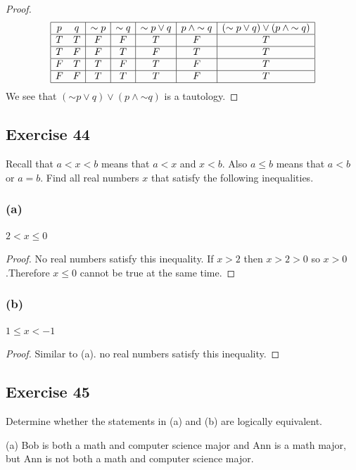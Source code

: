 \documentclass[14pt]{extarticle}
\begin{document}
\begin{proof}
$$
\begin{array}{|cc|c|c|c|c|c|}
\hline
p & q & {\sim p} & {\sim q} & {\sim p} \vee q & p \wedge {\sim q} &
({\sim p} \vee q) \vee (p \wedge {\sim q}) \\
\hline
T & T & F & F & T & F & T \\
\hline
T & F & F & T & F & T & T \\
\hline
F & T & T & F & T & F & T \\
\hline
F & F & T & T & T & F & T \\
\hline
\end{array}
$$
We see that $({\sim p} \vee q) \vee (p \wedge {\sim q})$ is a tautology.
\end{proof}

\subsection{Exercise 44}
Recall that $a < x < b$ means that $a < x$ and $x < b$. Also $a \leq b$ means
that $a < b$ or $a = b$. Find all real numbers $x$ that satisfy the following
inequalities.

\subsubsection{(a)}
$2 < x \leq 0$

\begin{proof}
No real numbers satisfy this inequality. If $x > 2$ then $x > 2 > 0$ so $x >
0$.Therefore $x \leq 0$ cannot be true at the same time.
\end{proof}

\subsubsection{(b)}
$1 \leq x < -1$

\begin{proof}
Similar to (a). no real numbers satisfy this inequality.
\end{proof}

\subsection{Exercise 45}
Determine whether the statements in (a) and (b) are logically equivalent.

(a)
Bob is both a math and computer science major and Ann is a math major, but Ann
is not both a math and computer science major.
\end{document}
